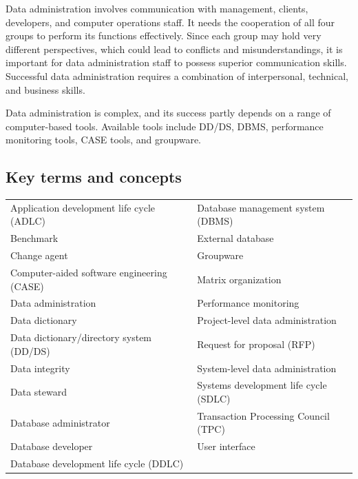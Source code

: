 \documentclass[
]{article}
\begin{document}
Data administration involves communication with management, clients,
developers, and computer operations staff. It needs the cooperation of
all four groups to perform its functions effectively. Since each group
may hold very different perspectives, which could lead to conflicts and
misunderstandings, it is important for data administration staff to
possess superior communication skills. Successful data administration
requires a combination of interpersonal, technical, and business skills.

Data administration is complex, and its success partly depends on a
range of computer-based tools. Available tools include DD/DS, DBMS,
performance monitoring tools, CASE tools, and groupware.

\hypertarget{key-terms-and-concepts-12}{%
\subsection*{Key terms and concepts}\label{key-terms-and-concepts-12}}

\begin{longtable}[]{@{}
  >{\raggedright\arraybackslash}p{}
  >{\raggedright\arraybackslash}p{}@{}}
\toprule
\endhead
Application development life cycle
(ADLC) & Database management system
(DBMS) \\
Benchmark & External database \\
Change agent & Groupware \\
Computer-aided software
engineering (CASE) & Matrix organization \\
Data administration & Performance monitoring \\
Data dictionary & Project-level data
administration \\
Data dictionary/directory system
(DD/DS) & Request for proposal (RFP) \\
Data integrity & System-level data
administration \\
Data steward & Systems development life cycle
(SDLC) \\
Database administrator & Transaction Processing Council
(TPC) \\
Database developer & User interface \\
Database development life cycle
(DDLC) & \\
\bottomrule
\end{longtable}
\end{document}
